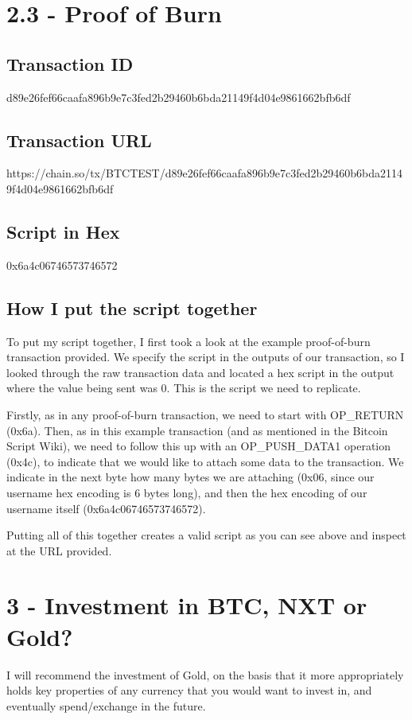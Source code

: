 \documentclass[11pt]{article}
\begin{document}
	\newpage
	
	
	\section*{2.3 - Proof of Burn}
	\subsection*{Transaction ID}
	d89e26fef66caafa896b9e7c3fed2b29460b6bda21149f4d04e9861662bfb6df
	
	\subsection*{Transaction URL}
	https://chain.so/tx/BTCTEST/d89e26fef66caafa896b9e7c3fed2b29460b6bda21149f4d04e9861662bfb6df
	
	\subsection*{Script in Hex}
	0x6a4c06746573746572
	
	\subsection*{How I put the script together}
	To put my script together, I first took a look at the example proof-of-burn transaction provided. We specify the script in the outputs of our transaction, so I looked through the raw transaction data and located a hex script in the output where the value being sent was 0. This is the script we need to replicate. \newline
	
	Firstly, as in any proof-of-burn transaction, we need to start with OP\_RETURN (0x6a). Then, as in this example transaction (and as mentioned in the Bitcoin Script Wiki), we need to follow this up with an OP\_PUSH\_DATA1 operation (0x4c), to indicate that we would like to attach some data to the transaction. We indicate in the next byte how many bytes we are attaching (0x06, since our username hex encoding is 6 bytes long), and then the hex encoding of our username itself (0x6a4c06746573746572). \newline
	
	Putting all of this together creates a valid script as you can see above and inspect at the URL provided.
	
	\newpage
	
	
	\section*{3 - Investment in BTC, NXT or Gold?}
	I will recommend the investment of Gold, on the basis that it more appropriately holds key properties of any currency that you would want to invest in, and eventually spend/exchange in the future. \newline
	
\end{document}
